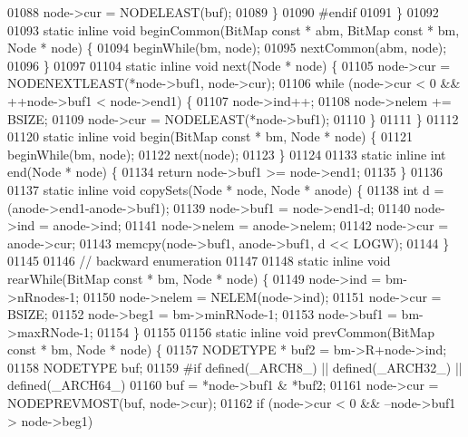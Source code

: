 \begin{DoxyCode}
01088         node->cur = NODELEAST(buf);
01089     \}
01090 \textcolor{preprocessor}{#endif}
01091 \}
01092 
01093 \textcolor{keyword}{static} \textcolor{keyword}{inline} \textcolor{keywordtype}{void} beginCommon(BitMap \textcolor{keyword}{const} * abm, BitMap \textcolor{keyword}{const} * bm, Node * node) \{
01094         beginWhile(bm, node);
01095         nextCommon(abm, node);
01096 \}
01097 
01104 \textcolor{keyword}{static} \textcolor{keyword}{inline} \textcolor{keywordtype}{void} next(Node * node) \{
01105         node->cur = NODENEXTLEAST(*node->buf1, node->cur);
01106         \textcolor{keywordflow}{while} (node->cur < 0 && ++node->buf1 < node->end1) \{
01107                 node->ind++;
01108                 node->nelem += BSIZE;
01109                 node->cur = NODELEAST(*node->buf1);
01110         \}
01111 \}
01112 
01120 \textcolor{keyword}{static} \textcolor{keyword}{inline} \textcolor{keywordtype}{void} begin(BitMap \textcolor{keyword}{const} * bm, Node * node) \{
01121         beginWhile(bm, node);
01122         next(node);
01123 \}
01124 
01133 \textcolor{keyword}{static} \textcolor{keyword}{inline} \textcolor{keywordtype}{int} end(Node * node) \{
01134         \textcolor{keywordflow}{return} node->buf1 >= node->end1;
01135 \}
01136 
01137 \textcolor{keyword}{static} \textcolor{keyword}{inline} \textcolor{keywordtype}{void} copySets(Node * node, Node * anode) \{
01138         \textcolor{keywordtype}{int} d = (anode->end1-anode->buf1);
01139         node->buf1 = node->end1-d;
01140         node->ind = anode->ind;
01141         node->nelem = anode->nelem;
01142         node->cur = anode->cur;
01143         memcpy(node->buf1, anode->buf1, d << LOGW);
01144 \}
01145 
01146 \textcolor{comment}{// backward enumeration}
01147 
01148 \textcolor{keyword}{static} \textcolor{keyword}{inline} \textcolor{keywordtype}{void} rearWhile(BitMap \textcolor{keyword}{const} * bm, Node * node) \{
01149         node->ind = bm->nRnodes-1;
01150         node->nelem = NELEM(node->ind);
01151         node->cur = BSIZE;
01152         node->beg1 = bm->minRNode-1;
01153         node->buf1 = bm->maxRNode-1;
01154 \}
01155 
01156 \textcolor{keyword}{static} \textcolor{keyword}{inline} \textcolor{keywordtype}{void} prevCommon(BitMap \textcolor{keyword}{const} * bm, Node * node) \{
01157         NODETYPE * buf2 = bm->R+node->ind;
01158     NODETYPE buf;
01159 \textcolor{preprocessor}{#if defined(\_ARCH8\_) || defined(\_ARCH32\_) || defined(\_ARCH64\_)}
01160     buf = *node->buf1 & *buf2;
01161     node->cur = NODEPREVMOST(buf, node->cur);
01162     \textcolor{keywordflow}{if} (node->cur < 0 && --node->buf1 > node->beg1)

\end{DoxyCode}
